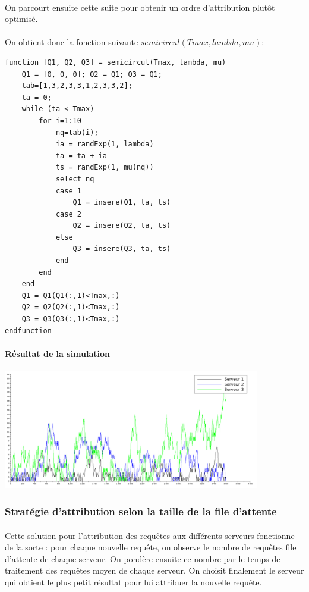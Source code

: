 \documentclass{article}
\begin{document}
\paragraph{}
On parcourt ensuite cette suite pour obtenir un ordre d'attribution plutôt optimisé.

\paragraph{}On obtient donc la fonction suivante $semicircul(Tmax,lambda,mu)$:
\begin{verbatim}
function [Q1, Q2, Q3] = semicircul(Tmax, lambda, mu)
    Q1 = [0, 0, 0]; Q2 = Q1; Q3 = Q1;
    tab=[1,3,2,3,3,1,2,3,3,2];  
    ta = 0;
    while (ta < Tmax)
        for i=1:10
            nq=tab(i);
            ia = randExp(1, lambda) 
            ta = ta + ia 
            ts = randExp(1, mu(nq)) 
            select nq 
            case 1 
                Q1 = insere(Q1, ta, ts)
            case 2
                Q2 = insere(Q2, ta, ts)
            else
                Q3 = insere(Q3, ta, ts)
            end
        end
    end
    Q1 = Q1(Q1(:,1)<Tmax,:)
    Q2 = Q2(Q2(:,1)<Tmax,:) 
    Q3 = Q3(Q3(:,1)<Tmax,:) 
endfunction 
\end{verbatim}

\paragraph{Résultat de la simulation}
\begin{center}
	\includegraphics[width=425px]{img/semiCirculaire.png}
\end{center}

\subsubsection{Stratégie d'attribution selon la taille de la file d'attente}

\paragraph{}
Cette solution pour l'attribution des requêtes aux différents serveurs fonctionne de la sorte :  pour chaque nouvelle requête, on observe le nombre de requêtes file d'attente de chaque serveur. On pondère ensuite ce nombre par le temps de traitement des requêtes moyen de chaque serveur. On choisit finalement le serveur qui obtient le plus petit résultat pour lui attribuer la nouvelle requête.
\end{document}
